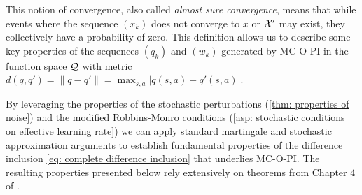 
\vspace{-0.5cm}

This notion of convergence, also called \textit{almost sure convergence}, means that while events where the sequence $(x_k)$ does not converge to $x$ or $\mathcal{X}'$ may exist, they collectively have a probability of zero.
This definition allows us to describe some key properties of the sequences $(q_k)$ and $(w_k)$ generated by MC-O-PI in the function space $\mathcal{Q}$ with metric $d(q, q') = \|q-q'\| = \max_{s,a} | q(s,a) - q'(s,a) |$.


By leveraging the properties of the stochastic perturbations (\autoref{thm: properties of noise}) and the modified Robbins-Monro conditions (\autoref{asp: stochastic conditions on effective learning rate})
we can apply standard martingale and stochastic approximation arguments to establish fundamental properties of the difference inclusion \eqref{eq: complete difference inclusion} that underlies MC-O-PI.
The resulting properties presented below rely extensively on theorems from Chapter 4 of \citep{Bertsekas1996Neuro-DynamicProgramming}.


% 





